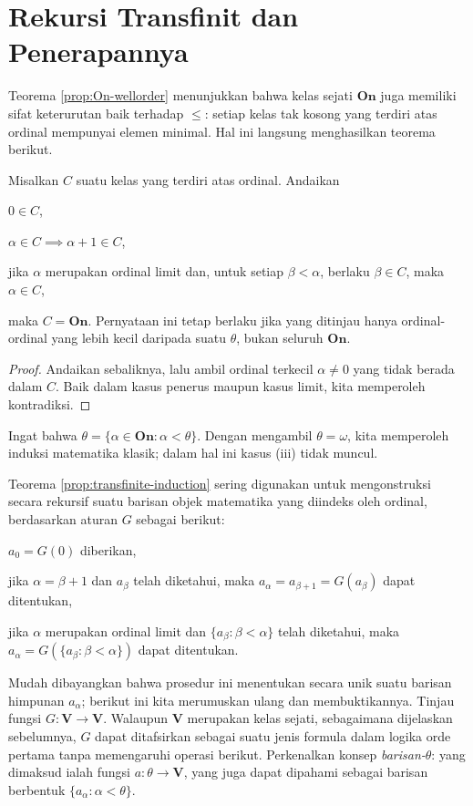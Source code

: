\section{Rekursi Transfinit dan Penerapannya}
Teorema \ref{prop:On-wellorder} menunjukkan bahwa kelas sejati $\textbf{On}$ juga memiliki sifat keterurutan baik terhadap $\leq$: setiap kelas tak kosong yang terdiri atas ordinal mempunyai elemen minimal. Hal ini langsung menghasilkan teorema berikut.
\begin{theorem}\label{prop:transfinite-induction} 
	Misalkan $C$ suatu kelas yang terdiri atas ordinal. Andaikan
	\begin{compactenum}[(i)]
		\item $0 \in C$,
		\item $\alpha \in C \implies \alpha+1 \in C$,
		\item jika $\alpha$ merupakan ordinal limit dan, untuk setiap $\beta < \alpha$, berlaku $\beta \in C$, maka $\alpha \in C$,
	\end{compactenum}
	maka $C = \textbf{On}$. Pernyataan ini tetap berlaku jika yang ditinjau hanya ordinal-ordinal yang lebih kecil daripada suatu $\theta$, bukan seluruh $\textbf{On}$.
\end{theorem}
\begin{proof}
	Andaikan sebaliknya, lalu ambil ordinal terkecil $\alpha \neq 0$ yang tidak berada dalam $C$. Baik dalam kasus penerus maupun kasus limit, kita memperoleh kontradiksi.
\end{proof}
\begin{remark}
	Ingat bahwa $\theta = \{\alpha \in \textbf{On}: \alpha < \theta \}$. Dengan mengambil $\theta = \omega$, kita memperoleh induksi matematika klasik; dalam hal ini kasus (iii) tidak muncul.
\end{remark}

Teorema \ref{prop:transfinite-induction} sering digunakan untuk mengonstruksi secara rekursif suatu barisan objek matematika yang diindeks oleh ordinal, berdasarkan aturan $G$ sebagai berikut:
\begin{compactdesc}
	\item[Suku ke-nol] $a_0 = G(0)$ diberikan,
	\item[Suku penerus] jika $\alpha = \beta+1$ dan $a_\beta$ telah diketahui, maka $a_\alpha = a_{\beta + 1} = G(a_\beta)$ dapat ditentukan,
	\item[Suku limit] jika $\alpha$ merupakan ordinal limit dan $\{a_\beta : \beta < \alpha \}$ telah diketahui, maka $a_\alpha = G(\{a_\beta : \beta < \alpha \})$ dapat ditentukan.
\end{compactdesc}
Mudah dibayangkan bahwa prosedur ini menentukan secara unik suatu barisan himpunan $a_\alpha$; berikut ini kita merumuskan ulang dan membuktikannya. Tinjau fungsi $G: \textbf{V} \to \textbf{V}$. Walaupun $\textbf{V}$ merupakan kelas sejati, sebagaimana dijelaskan sebelumnya, $G$ dapat ditafsirkan sebagai suatu jenis formula dalam logika orde pertama tanpa memengaruhi operasi berikut. Perkenalkan konsep \emph{barisan-$\theta$}: yang dimaksud ialah fungsi $a: \theta \to \textbf{V}$, yang juga dapat dipahami sebagai barisan berbentuk $\{a_\alpha : \alpha < \theta \}$.

